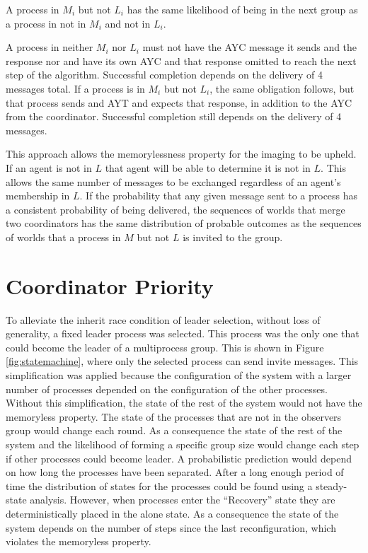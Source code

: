 \begin{thm}
A process in $M_i$ but not $L_i$ has the same likelihood of being in the next group as a process in not in $M_i$ and not in $L_i$.
\end{thm}

A process in neither $M_i$ nor $L_i$ must not have the \ac{AYC} message it sends and the response nor and have its own \ac{AYC} and that response omitted to reach the next step of the algorithm.
Successful completion depends on the delivery of 4 messages total.
If a process is in $M_i$ but not $L_i$, the same obligation follows, but that process sends and \ac{AYT} and expects that response, in addition to the \ac{AYC} from the coordinator.
Successful completion still depends on the delivery of 4 messages.

This approach allows the memorylessness property for the imaging to be upheld. If an agent is not in $L$ that agent will be able to determine it is not in $L$. This allows the same number of messages to be exchanged regardless of an agent's membership in $L$. If the probability that any given message sent to a process has a consistent probability of being delivered, the sequences of worlds that merge two coordinators has the same distribution of probable outcomes as the sequences of worlds that a process in $M$ but not $L$ is invited to the group.

\section{Coordinator Priority}

To alleviate the inherit race condition of leader selection, without loss of generality, a fixed leader process was selected.
This process was the only one that could become the leader of a multiprocess group.
This is shown in Figure \ref{fig:statemachine}, where only the selected process can send invite messages.
This simplification was applied because the configuration of the system with a larger number of processes depended on the configuration of the other processes.
Without this simplification, the state of the rest of the system would not have the memoryless property.
The state of the processes that are not in the observers group would change each round.
As a consequence the state of the rest of the system and the likelihood of forming a specific group size would change each step if other processes could become leader.
A probabilistic prediction would depend on how long the processes have been separated.
After a long enough period of time the distribution of states for the processes could be found using a steady-state analysis.
However, when processes enter the ``Recovery'' state they are deterministically placed in the alone state.
As a consequence the state of the system depends on the number of steps since the last reconfiguration, which violates the memoryless property.

